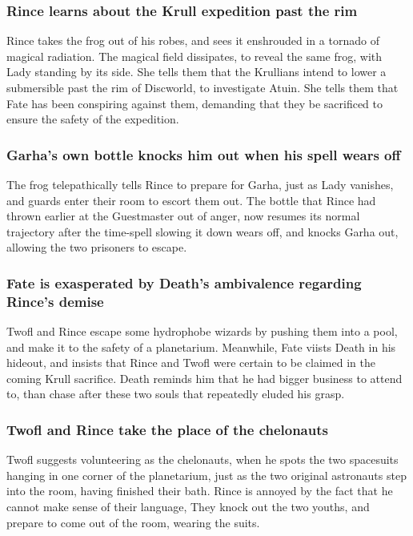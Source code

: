 \subsubsection{\Gls{Rince} learns about the Krull expedition past the rim}
\Gls{Rince} takes the frog out of his robes, and sees it enshrouded in a tornado of magical
radiation. The magical field dissipates, to reveal the same frog, with \Gls{Lady} standing by its
side. She tells them that the Krullians intend to lower a submersible past the rim of Discworld, to
investigate \Gls{Atuin}. She tells them that \Gls{Fate} has been conspiring against them, demanding
that they be sacrificed to ensure the safety of the expedition.

\subsubsection{\Gls{Garha}'s own bottle knocks him out when his spell wears off}
The frog telepathically tells \Gls{Rince} to prepare for \Gls{Garha}, just as \Gls{Lady} vanishes,
and guards enter their room to escort them out. The bottle that \Gls{Rince} had thrown earlier at
the Guestmaster out of anger, now resumes its normal trajectory after the time-spell slowing it
down wears off, and knocks \Gls{Garha} out, allowing the two prisoners to escape.

\subsubsection{\Gls{Fate} is exasperated by \Gls{Death}'s ambivalence regarding \Gls{Rince}'s
    demise}
\Gls{Twofl} and \Gls{Rince} escape some hydrophobe wizards by pushing them into a pool, and make it
to the safety of a planetarium. Meanwhile, \Gls{Fate} viists \Gls{Death} in his hideout, and
insists that \Gls{Rince} and \Gls{Twofl} were certain to be claimed in the coming Krull sacrifice.
\Gls{Death} reminds him that he had bigger business to attend to, than chase after these two souls
that repeatedly eluded his grasp.

\subsubsection{\Gls{Twofl} and \Gls{Rince} take the place of the chelonauts}
\Gls{Twofl} suggests volunteering as the chelonauts, when he spots the two spacesuits hanging in
one corner of the planetarium, just as the two original astronauts step into the room, having
finished their bath. \Gls{Rince} is annoyed by the fact that he cannot make sense of their language,
They knock out the two youths, and prepare to come out of the room, wearing the suits.


